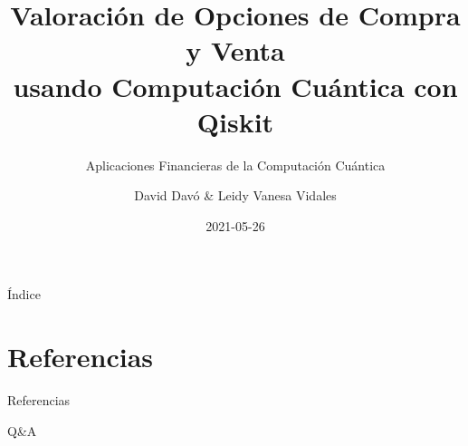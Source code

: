 \documentclass[aspectratio=169,svgnames]{beamer}
\title[Quantum Computation Quant]{Valoración de Opciones de Compra y Venta\\ usando Computación Cuántica con Qiskit}
\subtitle{Aplicaciones Financieras de la Computación Cuántica}
\author{David Davó \& Leidy Vanesa Vidales}
\date{2021-05-26}
\begin{document}
\frame[plain]{\titlepage}

% 

\setcounter{tocdepth}{2}
\begin{frame}[allowframebreaks]{Índice}
  \tableofcontents
\end{frame}






\section*{Referencias}
\begin{frame}[allowframebreaks]{Referencias}
    \nocite{*}
    \printbibliography
\end{frame}

\setcounter{tocdepth}{2}
\begin{frame}[plain]{Q\&A}
    \begin{minipage}[t][.8\textheight]{\textwidth}
        \small
        \tableofcontents
    \end{minipage}
    {\tiny\doclicenseThis}
\end{frame}
\end{document}
